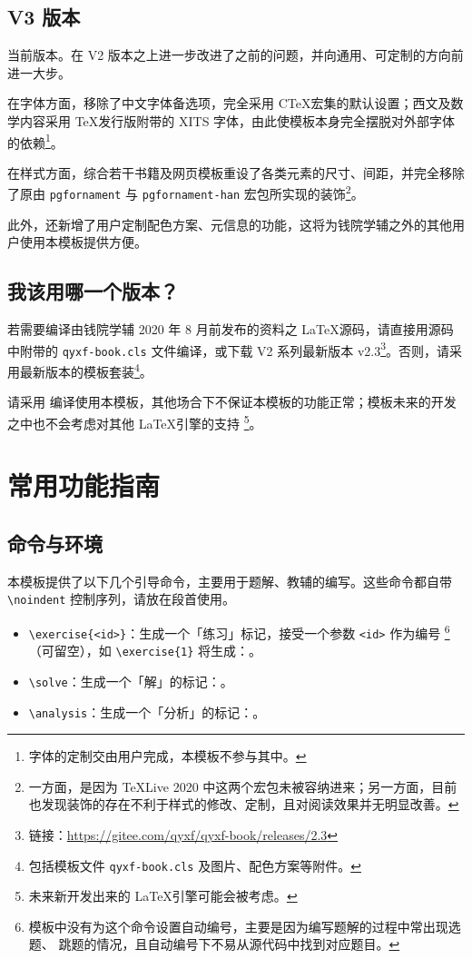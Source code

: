 \documentclass[
  xits = false,
  10pt,
  twoside,
  openany,
  b5paper, %
  colorscheme = basic %
]{qyxf-book}
\begin{document}
\subsection{V3 版本}

当前版本。在 V2 版本之上进一步改进了之前的问题，并向通用、可定制的方向前进一大步。

在字体方面，移除了中文字体备选项，完全采用 C\TeX 宏集的默认设置；西文及数学内容采用 \TeX 发行版附带的 XITS 字体，由此使模板本身完全摆脱对外部字体的依赖\footnote{字体的定制交由用户完成，本模板不参与其中。}。

在样式方面，综合若干书籍及网页模板重设了各类元素的尺寸、间距，并完全移除了原由 \verb|pgfornament| 与 \verb|pgfornament-han| 宏包所实现的装饰\footnote{一方面，是因为 \TeX Live 2020 中这两个宏包未被容纳进来；另一方面，目前也发现装饰的存在不利于样式的修改、定制，且对阅读效果并无明显改善。}。

此外，还新增了用户定制配色方案、元信息的功能，这将为钱院学辅之外的其他用户使用本模板提供方便。

\subsection{我该用哪一个版本？}

若需要编译由钱院学辅 2020 年 8 月前发布的资料之 \LaTeX 源码，请直接用源码中附带的 \verb|qyxf-book.cls| 文件编译，或下载 V2 系列最新版本 v2.3\footnote{链接：\url{https://gitee.com/qyxf/qyxf-book/releases/2.3}}。否则，请采用最新版本的模板套装\footnote{包括模板文件 \texttt{qyxf-book.cls} 及图片、配色方案等附件。}。


\begin{alert}
  请采用  编译使用本模板，其他场合下不保证本模板的功能正常；模板未来的开发之中也不会考虑对其他 \LaTeX 引擎的支持
  \footnote{未来新开发出来的 \LaTeX 引擎可能会被考虑。}。
\end{alert}

\section{常用功能指南}

\subsection{命令与环境}

本模板提供了以下几个引导命令，主要用于题解、教辅的编写。这些命令都自带 \verb|\noindent| 控制序列，请放在段首使用。

\begin{itemize}
  \item \verb|\exercise{<id>}|：生成一个「练习」标记，接受一个参数 \verb|<id>| 作为编号
        \footnote{模板中没有为这个命令设置自动编号，主要是因为编写题解的过程中常出现选题、
        跳题的情况，且自动编号下不易从源代码中找到对应题目。}
        （可留空），如 \verb|\exercise{1}| 将生成：。
  \item \verb|\solve|：生成一个「解」的标记：\solve。
  \item \verb|\analysis|：生成一个「分析」的标记：\analysis。
\end{itemize}
\end{document}

